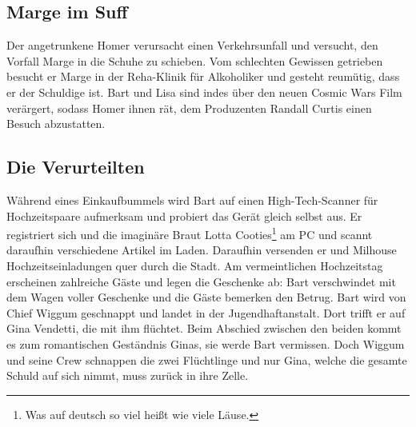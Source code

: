 \subsection{Marge im Suff}\label{FABF10}
Der angetrunkene Homer verursacht einen Verkehrsunfall und versucht, den Vorfall Marge in die Schuhe zu schieben. Vom schlechten Gewissen getrieben besucht er Marge in der Reha-Klinik für Alkoholiker und gesteht reumütig, dass er der Schuldige ist. Bart und Lisa sind indes über den neuen Cosmic Wars Film verärgert, sodass Homer ihnen rät, dem Produzenten Randall Curtis einen Besuch abzustatten.


\subsection{Die Verurteilten}\label{FABF11}
Während eines Einkaufbummels wird Bart auf einen High-Tech-Scanner für Hochzeitspaare aufmerksam und probiert das Gerät gleich selbst aus. Er registriert sich und die imaginäre Braut Lotta Cooties\footnote{Was auf deutsch so viel heißt wie viele Läuse.} am PC und scannt daraufhin verschiedene Artikel im Laden. Daraufhin versenden er und Milhouse Hochzeitseinladungen quer durch die Stadt. Am vermeintlichen Hochzeitstag erscheinen zahlreiche Gäste und legen die Geschenke ab: Bart verschwindet mit dem Wagen voller Geschenke und die Gäste bemerken den Betrug. Bart wird von Chief Wiggum geschnappt und landet in der Jugendhaftanstalt. Dort trifft er auf Gina Vendetti, die mit ihm flüchtet. Beim Abschied zwischen den beiden kommt es zum romantischen Geständnis Ginas, sie werde Bart vermissen. Doch Wiggum und seine Crew schnappen die zwei Flüchtlinge und nur Gina, welche die gesamte Schuld auf sich nimmt, muss zurück in ihre Zelle.

